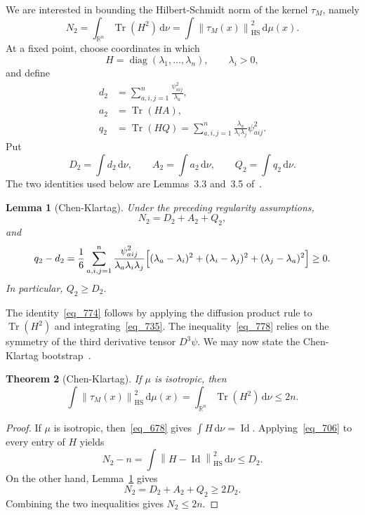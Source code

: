 \documentclass[12pt]{article}
\newtheorem{theorem}{Theorem}[section]
\newtheorem{lemma}[theorem]{Lemma}
\theoremstyle{definition}
\theoremstyle{remark}
\newcommand{\R}{\mathbb R}
\newcommand{\Tr}{\operatorname{Tr}}
\newcommand{\Id}{\operatorname{Id}}
\newcommand{\HS}{\mathrm{HS}}
\newcommand{\dd}{\,\mathrm d}
\newcommand{\norm}[1]{\left\lVert #1\right\rVert}
\newcommand{\tauM}{\tau_M}
\begin{document}
We are interested in bounding the Hilbert-Schmidt norm of the kernel
$\tauM$, namely
\begin{equation}\label{eq_742}
  N_2=\int_{\R^n}\Tr(H^2)\dd\nu
  =\int\norm{\tauM(x)}_{\HS}^2\dd\mu(x).
\end{equation}
At a fixed point, choose coordinates in which
\[
  H=\operatorname{diag}(\lambda_1,\ldots,\lambda_n),
  \qquad \lambda_i>0,
\]
and define
\begin{align*}
  d_2
  &=\sum_{a,i,j=1}^n\frac{\psi_{aij}^2}{\lambda_a},\\
  a_2&=\Tr(HA),\\
  q_2
  &=\Tr(HQ)
  =\sum_{a,i,j=1}^n
  \frac{\lambda_a}{\lambda_i\lambda_j}\psi_{aij}^2.
\end{align*}
Put
\begin{equation}\label{eq_762}
  D_2=\int d_2\dd\nu,
  \qquad
  A_2=\int a_2\dd\nu,
  \qquad
  Q_2=\int q_2\dd\nu.
\end{equation}
The two identities used below are Lemmas~3.3 and~3.5
of~\cite{ChenKlartag}.

\begin{lemma}[Chen-Klartag]\label{lem_772}
Under the preceding regularity assumptions,
\begin{equation}\label{eq_774}
  N_2=D_2+A_2+Q_2,
\end{equation}
and
\begin{equation}\label{eq_778}
  q_2-d_2
  =\frac16\sum_{a,i,j=1}^n
  \frac{\psi_{aij}^2}{\lambda_a\lambda_i\lambda_j}
  \Bigl[(\lambda_a-\lambda_i)^2
       +(\lambda_i-\lambda_j)^2
       +(\lambda_j-\lambda_a)^2\Bigr]\geq0.
\end{equation}
In particular, $Q_2\geq D_2$.
\end{lemma}

The identity~\eqref{eq_774} follows by applying the
diffusion product rule to $\Tr(H^2)$ and integrating~\eqref{eq_735}.
The inequality~\eqref{eq_778} relies on the symmetry of the third
derivative tensor $D^3\psi$. We may now state the Chen-Klartag
bootstrap~\cite[Theorem~1.5]{ChenKlartag}.

\begin{theorem}[Chen-Klartag]\label{thm_795}
If $\mu$ is isotropic, then
\begin{equation}\label{eq_797}
  \int\norm{\tauM(x)}_{\HS}^2\dd\mu(x) = \int_{\R^n}\Tr(H^2)\dd\nu\leq2n.
\end{equation}
\end{theorem}

\begin{proof}
If $\mu$ is isotropic, then~\eqref{eq_678} gives
$\int H\dd\nu=\Id$. Applying~\eqref{eq_706} to every entry of
$H$ yields
\begin{equation}\label{eq_806}
  N_2-n
  =\int\norm{H-\Id}_{\HS}^2\dd\nu
  \leq D_2.
\end{equation}
On the other hand, Lemma~\ref{lem_772} gives
\[
  N_2=D_2+A_2+Q_2\geq2D_2.
\]
Combining the two inequalities gives $N_2\leq2n$.
\end{proof}
\end{document}
